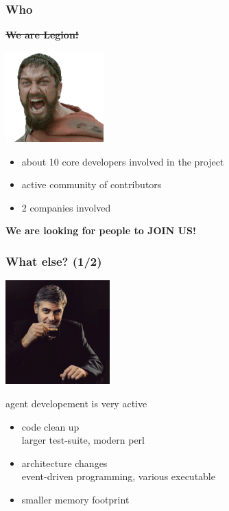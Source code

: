 \documentclass{beamer}
\begin{document}
\begin{frame}
    \frametitle{Who}

    \sout{\bf{We are Legion!}}
    \begin{center}
    \includegraphics[height=3.5cm]{./pics/sparta.jpg}
    \end{center}

    \begin{itemize}
    \item about 10 core developers involved in the project
    \item active community of contributors
    \item 2 companies involved
    \end{itemize}

    \pause
    \bf{We are looking for people to JOIN US!}
\end{frame}


\begin{frame}
    \frametitle{What else? (1/2)}

    \begin{center}
    \includegraphics[height=4.0cm]{pics/whatelse.jpg}
    \end{center}

    \pause

    \begin{block}{agent developement is very active}
        \begin{itemize}
            \item code clean up\\
            {\small larger test-suite, modern perl}
            \item architecture changes\\
            {\small event-driven programming, various executable}
            \item smaller memory footprint
        \end{itemize}
    \end{block}
\end{frame}
\end{document}
